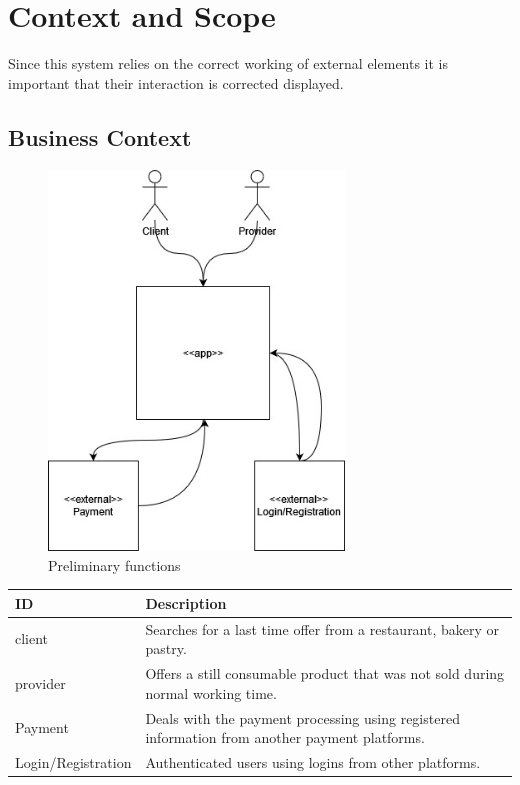 \section{Context and Scope}

Since this system relies on the correct working of external elements it is important that their interaction is 
corrected displayed.

\subsection{Business Context}

\begin{figure}[H]
    \centering
    \includegraphics[width=0.7\textwidth]{assets/business_context.jpg}
    \caption{Preliminary functions}
    \label{fig:preliminary_use_case}
\end{figure}

\begin{table}[H]
    \begin{tabularx}{\textwidth}{lX}
    \toprule
    ID & Description   \\
    \midrule
    \gls{client} & Searches for a last time offer from a restaurant, bakery or pastry. \\
    \gls{provider} & Offers a still consumable product that was not sold during normal working time. \\
    Payment & Deals with the payment processing using registered information from another payment platforms. \\
    Login/Registration & Authenticated \gls{users} using logins from other platforms.  \\
    \bottomrule
    \end{tabularx}
\end{table}

